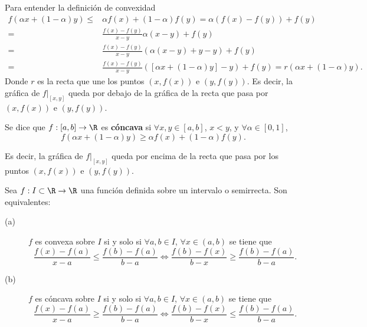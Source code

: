 \begin{observation}
\normalfont Para entender la definición de convexidad
\[
\begin{split}
	f\left(\alpha x + \left(1-\alpha \right)y\right) \leq & \alpha f\left(x\right) + \left(1-\alpha \right)f\left(y\right) =  \alpha \left(f\left(x\right)-f\left(y\right)\right) + f\left(y\right) \\
	= & \frac{f\left(x\right)-f\left(y\right)}{x-y}\alpha\left(x-y\right) + f\left(y\right) \\
	= & \frac{f\left(x\right)-f\left(y\right)}{x-y}\left(\alpha\left(x-y\right)+y-y\right) + f\left(y\right) \\
	= & \frac{f\left(x\right)-f\left(y\right)}{x-y}\left( \left[\alpha x + \left(1-\alpha \right)y\right] -y\right) + f\left(y\right) = r\left(\alpha x + \left(1-\alpha\right)y\right).
\end{split}
\]
Donde $\displaystyle r $ es la recta que une los puntos $\displaystyle \left(x,f\left(x\right)\right) $ e $\displaystyle \left(y,f\left(y\right)\right) $.
Es decir, la gráfica de $\displaystyle f|_{\left[x,y\right] } $ queda por debajo de la gráfica de la recta que pasa por $\displaystyle \left(x, f\left(x\right)\right) $ e $\displaystyle \left(y, f\left(y\right)\right) $.
\end{observation}
\begin{fdefinition}[]
	\normalfont Se dice que $\displaystyle f:\left[a,b\right] \to \R $ es \textbf{cóncava} si $\displaystyle \forall x,y \in [a,b] $, $\displaystyle x<y $, y $\displaystyle \forall \alpha \in [0,1] $, 
	\[ f\left(\alpha x + \left(1-\alpha \right)y\right) \geq \alpha f\left(x\right) + \left(1-\alpha \right)f\left(y\right) .\]
\end{fdefinition}
Es decir, la gráfica de $\displaystyle f|_{[x,y]} $ queda por encima de la recta que pasa por los puntos $\displaystyle \left(x,f\left(x\right)\right) $ e $\displaystyle \left(y,f\left(y\right)\right) $.
\begin{fprop}[]
\normalfont Sea $\displaystyle f: I \subset \R \to \R $ una función definida sobre un intervalo o semirrecta. Son equivalentes:
\begin{description}
\item[(a)] $\displaystyle f $ es convexa sobre $\displaystyle I $ si y solo si $\displaystyle \forall a,b \in I $, $\displaystyle \forall x \in \left(a,b\right) $ se tiene que
	\[ \frac{f\left(x\right)-f\left(a\right)}{x-a} \leq \frac{f\left(b\right)-f\left(a\right)}{b-a} \iff \frac{f\left(b\right)-f\left(x\right)}{b-x} \geq \frac{f\left(b\right)-f\left(a\right)}{b-a}.\]
	
\item[(b)] $\displaystyle f $ es cóncava sobre $\displaystyle I $ si y solo si $\displaystyle \forall a,b \in I $, $\displaystyle \forall x \in \left(a,b\right) $ se tiene que 
	\[\frac{f\left(x\right)-f\left(a\right)}{x-a} \geq \frac{f\left(b\right)-f\left(a\right)}{b-a} \iff \frac{f\left(b\right)-f\left(x\right)}{b-x} \leq \frac{f\left(b\right)-f\left(a\right)}{b-a} .\]	
\end{description}
\end{fprop}
